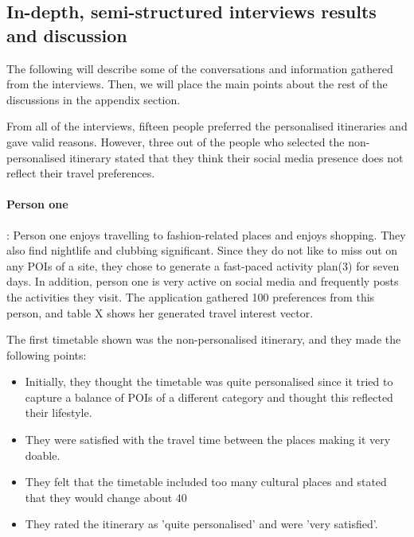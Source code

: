
\subsection{In-depth, semi-structured interviews results and discussion}


The following will describe some of the conversations and information gathered
from the interviews. Then, we will place the main points about the rest of the
discussions in the appendix section. 

From all of the interviews, fifteen people preferred the personalised
itineraries and gave valid reasons. However, three out of the people who
selected the non-personalised itinerary stated that they think their social
media presence does not reflect their travel preferences.

\paragraph{Person one}:  Person one enjoys travelling to fashion-related places
and enjoys shopping. They also find nightlife and clubbing significant. Since
they do not like to miss out on any POIs of a site, they chose to generate a
fast-paced activity plan(3) for seven days. In addition, person one is very
active on social media and frequently posts the activities they visit. The
application gathered 100 preferences from this person, and table X shows her
generated travel interest vector.
									
The first timetable shown was the non-personalised itinerary, and they made the
following points:

\begin{itemize}
\item Initially, they thought the timetable was quite personalised since it tried to capture a balance of POIs of a different category and thought this reflected their lifestyle.
\item They were satisfied with the travel time between the places making it very doable.
\item They felt that the timetable included too many cultural places and stated that they would change about 40%
\item They rated the itinerary as 'quite personalised' and were 'very satisfied'.
\end{itemize}

